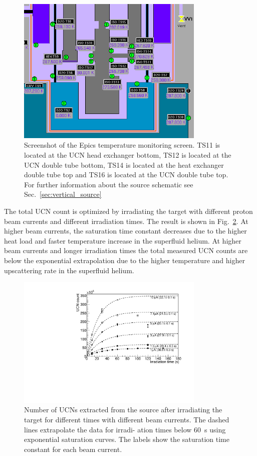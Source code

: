 \begin{figure}[h!]
  \centering
  \includegraphics[width=0.8\textwidth]{TSs.png}
  \caption{Screenshot of the Epics temperature monitoring screen. TS11
    is located at the UCN head exchanger bottom, TS12 is located at
    the UCN double tube bottom, TS14 is located at the heat exchanger
    double tube top and TS16 is located at the UCN double tube
    top. For further information about the source schematic see
    Sec.~\ref{sec:vertical_source} }
  \label{fig:TSs}
\end{figure}




The total UCN count is optimized by irradiating the target with
different proton beam currents and different irradiation times. The
result is shown in Fig.~\ref{fig:counts_vs_irrad}. At higher beam
currents, the saturation time constant decreases due to the higher
heat load and faster temperature increase in the superfluid helium. At
higher beam currents and longer irradiation times the total measured
UCN counts are below the exponential extrapolation due to the higher
temperature and higher upscattering rate in the superfluid helium.

\begin{figure}[h!]
  \centering
  \includegraphics[width=0.8\textwidth]{UCNCounts_vs_irradTime.pdf}
  \caption{Number of UCNs extracted from the source after irradiating
    the target for different times with different beam currents. The
    dashed lines extrapolate the data for irradi- ation times below
    60~s using exponential saturation curves.  The labels show the
    saturation time constant for each beam current. }
  \label{fig:counts_vs_irrad}
\end{figure}


